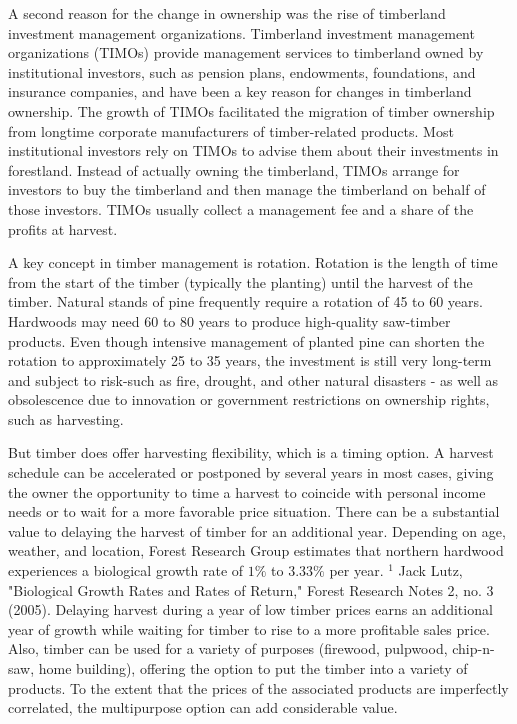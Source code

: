 \documentclass[11pt]{article}
\begin{document}
A second reason for the change in ownership was the rise of timberland investment management organizations. Timberland investment management organizations (TIMOs) provide management services to timberland owned by institutional investors, such as pension plans, endowments, foundations, and insurance companies, and have been a key reason for changes in timberland ownership. The growth of TIMOs facilitated the migration of timber ownership from longtime corporate manufacturers of timber-related products. Most institutional investors rely on TIMOs to advise them about their investments in forestland. Instead of actually owning the timberland, TIMOs arrange for investors to buy the timberland and then manage the timberland on behalf of those investors. TIMOs usually collect a management fee and a share of the profits at harvest.

A key concept in timber management is rotation. Rotation is the length of time from the start of the timber (typically the planting) until the harvest of the timber. Natural stands of pine frequently require a rotation of 45 to 60 years. Hardwoods may need 60 to 80 years to produce high-quality saw-timber products. Even though intensive management of planted pine can shorten the rotation to approximately 25 to 35 years, the investment is still very long-term and subject to risk-such as fire, drought, and other natural disasters - as well as obsolescence due to innovation or government restrictions on ownership rights, such as harvesting.

But timber does offer harvesting flexibility, which is a timing option. A harvest schedule can be accelerated or postponed by several years in most cases, giving the owner the opportunity to time a harvest to coincide with personal income needs or to wait for a more favorable price situation. There can be a substantial value to delaying the harvest of timber for an additional year. Depending on age, weather, and location, Forest Research Group estimates that northern hardwood experiences a biological growth rate of $1 \%$ to $3.33 \%$ per year. ${ }^{1}$ Jack Lutz, "Biological Growth Rates and Rates of Return," Forest Research Notes 2, no. 3 (2005). Delaying harvest during a year of low timber prices earns an additional year of growth while waiting for timber to rise to a more profitable sales price. Also, timber can be used for a variety of purposes (firewood, pulpwood, chip-n-saw, home building), offering the option to put the timber into a variety of products. To the extent that the prices of the associated products are imperfectly correlated, the multipurpose option can add considerable value.
\end{document}
